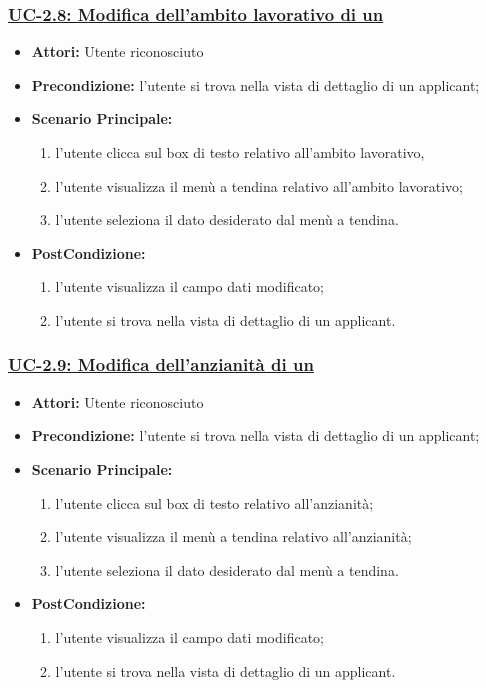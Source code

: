 \subsubsection{\underline{UC-2.8: Modifica dell'ambito lavorativo di un \applicant}}
\begin{itemize}
	\item \textbf{Attori:} Utente riconosciuto
	\item \textbf{Precondizione:}  l'utente si trova nella vista di dettaglio di un applicant;
	\item \textbf{Scenario Principale:}
	\begin{enumerate}
		\item l'utente clicca sul box di testo relativo all'ambito lavorativo,
		\item l'utente visualizza il  menù a tendina relativo all'ambito lavorativo;
		\item l'utente seleziona il dato desiderato dal menù a tendina.
	\end{enumerate}
	\item \textbf{PostCondizione:} 
	\begin{enumerate}
		\item l'utente visualizza il campo dati modificato;
		\item l'utente si trova nella vista di dettaglio di un applicant.
	\end{enumerate}
	
\end{itemize}

\subsubsection{\underline{UC-2.9: Modifica dell'anzianità di un \applicant}}
\begin{itemize}
	\item \textbf{Attori:} Utente riconosciuto
	\item \textbf{Precondizione:}  l'utente si trova nella vista di dettaglio di un applicant;
	\item \textbf{Scenario Principale:}
	\begin{enumerate}
		\item l'utente clicca sul box di testo relativo all'anzianità;
		\item l'utente visualizza il menù a tendina relativo all'anzianità;
		\item l'utente seleziona il dato desiderato dal menù a tendina.
	\end{enumerate}
	\item \textbf{PostCondizione:} 
	\begin{enumerate}
		\item l'utente visualizza il campo dati modificato;
		\item l'utente si trova nella vista di dettaglio di un applicant.
	\end{enumerate}
	
\end{itemize}


